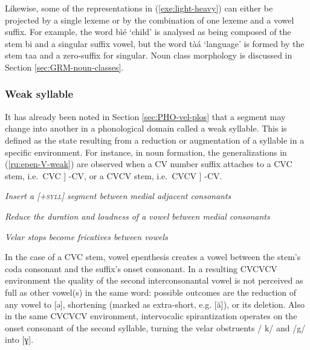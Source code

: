 Likewise,  some of the representations in (\ref{exe:light-heavy}) can
either be
projected by a single lexeme or by the combination of  one lexeme and a vowel
suffix.  For example,  the word {\sls bìé} `child' is analysed as being 
composed of the
stem {\sls bi}    and a singular suffix vowel, but the word {\sls tàá}  
`language' is  formed by the stem {\sls taa}  and a  zero-suffix for
singular.   Noun class morphology is discussed in Section 
\ref{sec:GRM-noun-classes}. 

 


\subsubsection{Weak syllable}
\label{sec:PHO-weak-syll}

It has already been noted in Section \ref{sec:PHO-vel-plos} that a segment may 
change into another in a phonological domain called a weak syllable.  This is  
defined  as the state resulting from a reduction or augmentation of a syllable 
in a specific environment.  For instance, in noun formation, the 
generalizations in 
(\ref{ru:epen-V-weak}) are observed when a CV number suffix attaches to a CVC 
stem, i.e.\ CVC ] -CV, or a CVCV stem, i.e.\ CVCV ] -CV. 



\ea\label{ru:epen-V-weak}
\par\nobreak\smallskip
 {\it Insert a \textsc{[+syll]} segment between medial adjacent 
consonants}

\par\nobreak\smallskip
 {\it Reduce the duration and loudness of a vowel between medial consonants}


\par\nobreak\smallskip
 {\it Velar stops become fricatives between vowels}

\z
\z


In the case of a CVC 
stem, vowel epenthesis creates a vowel between the stem's coda consonant and the 
suffix's onset consonant.   In a resulting CVCVCV environment the quality of the 
second interconsonantal vowel  is not perceived as full as other vowel(s) in the 
same word: possible outcomes are the reduction of any vowel to [{\sls ə}],  
shortening  (marked as extra-short, e.g.  [{\sls ă}]),  or its  deletion. 
Also in the same CVCVCV environment, intervocalic spirantization operates on the 
onset consonant of the second syllable,  turning the velar obstruents /{\sls 
k}/ 
and /{\sls g}/ into [{\sls ɣ}]. 





